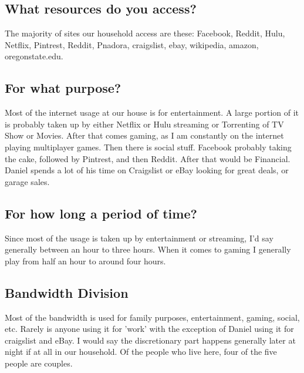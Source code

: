 \documentclass[12pt,letterpaper]{article}
\begin{document}
\subsection{What resources do you access?}
The majority of sites our household access are these:
Facebook, Reddit, Hulu, Netflix, Pintrest, Reddit, Pnadora, craigslist,
ebay, wikipedia, amazon, oregonstate.edu.

\subsection{For what purpose?}
Most of the internet usage at our house is for entertainment. A large
portion of it is probably taken up by either Netflix or Hulu streaming or
Torrenting of TV Show or Movies. After that comes gaming, as I am
constantly on the internet playing multiplayer games. Then there is
social stuff. Facebook probably taking the cake, followed by Pintrest,
and then Reddit. After that would be Financial. Daniel spends a lot of
his time on Craigslist or eBay looking for great deals, or garage sales.

\subsection{For how long a period of time?}
Since most of the usage is taken up by entertainment or streaming, I'd
say generally between an hour to three hours. When it comes to gaming I
generally play from half an hour to around four hours.

\subsection{Bandwidth Division}
Most of the bandwidth is used for family purposes, entertainment,
gaming, social, etc. Rarely is anyone using it for 'work' with the
exception of Daniel using it for craigslist and eBay. I would say the
discretionary part happens generally later at night if at all in our
household. Of the people who live here, four of the five people are
couples.
\end{document}
